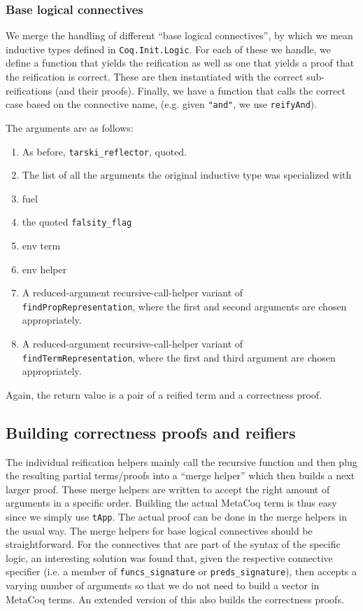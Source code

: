 \documentclass[11pt,a4paper]{article}
\begin{document}
\subsubsection{Base logical connectives}
We merge the handling of different \enquote{base logical connectives}, by which we mean inductive types defined in \lstinline|Coq.Init.Logic|. For each of these we handle, we define a function that yields the reification as well as one that yields a proof that the reification is correct. These are then instantiated with the correct sub-reifications (and their proofs). Finally, we have a function that calls the correct case based on the connective name, (e.g. given \lstinline|"and"|, we use \lstinline|reifyAnd|).

The arguments are as follows:
\begin{enumerate}
	\item As before, \lstinline|tarski_reflector|, quoted.
	\item The list of all the arguments the original inductive type was specialized with
	\item fuel
	\item the quoted \lstinline|falsity_flag|
	\item env term
	\item env helper
	\item A reduced-argument recursive-call-helper variant of \lstinline|findPropRepresentation|, where the first and second arguments are chosen appropriately.
	\item A reduced-argument recursive-call-helper variant of \lstinline|findTermRepresentation|, where the first and third argument are chosen appropriately.
\end{enumerate}
Again, the return value is a pair of a reified term and a correctness proof.
\subsection{Building correctness proofs and reifiers}
The individual reification helpers mainly call the recursive function and then plug the resulting partial terms/proofs into a \enquote{merge helper} which then builds a next larger proof. These merge helpers are written to accept the right amount of arguments in a specific order. Building the actual MetaCoq term is thus easy since we simply use \lstinline|tApp|. The actual proof can be done in the merge helpers in the usual way. The merge helpers for base logical connectives should be straightforward. For the connectives that are part of the syntax of the specific logic, an interesting solution was found that, given the respective connective specifier (i.e. a member of \lstinline|funcs_signature| or \lstinline|preds_signature|), then accepts a varying number of arguments so that we do not need to build a vector in MetaCoq terms. An extended version of this also builds the correctness proofs.
\newpage
\end{document}
